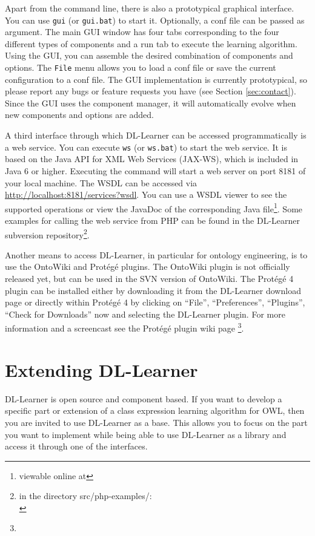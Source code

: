 \documentclass[a4paper,12pt]{scrartcl}
\begin{document}
Apart from the command line, there is also a prototypical graphical interface. You can use \verb|gui| (or \verb|gui.bat|) to start it. Optionally, a conf file can be passed as argument. The main GUI window has four tabs corresponding to the four different types of components and a run tab to execute the learning algorithm. Using the GUI, you can assemble the desired combination of components and options. The \verb|File| menu allows you to load a conf file or save the current configuration to a conf file. The GUI implementation is currently prototypical, so please report any bugs or feature requests you have (see Section \ref{sec:contact}). Since the GUI uses the component manager, it will automatically evolve when new components and options are added.

A third interface through which DL-Learner can be accessed programmatically is a web service. You can execute \verb|ws| (or \verb|ws.bat|) to start the web service. It is based on the Java API for XML Web Services (JAX-WS), which is included in Java 6 or higher. Executing the command will start a web server on port 8181 of your local machine. The WSDL can be accessed via \url{http://localhost:8181/services?wsdl}. You can use a WSDL viewer to see the supported operations or view the JavaDoc of the corresponding Java file\footnote{viewable online at \wsjavadoc}. Some examples for calling the web service from PHP can be found in the DL-Learner subversion repository\footnote{in the directory src/php-examples/:\\ \wsphpexamples}.

Another means to access DL-Learner, in particular for ontology engineering, is to use the OntoWiki and Protégé plugins. The OntoWiki plugin is not officially released yet, but can be used in the SVN version of OntoWiki. The Protégé 4 plugin can be installed either by downloading it from the DL-Learner download page or directly within Protégé 4 by clicking on ``File'', ``Preferences'', ``Plugins'', ``Check for Downloads'' now and selecting the DL-Learner plugin. For more information and a screencast see the Protégé plugin wiki page \footnote{\wikiprotplugin}.

\section{Extending DL-Learner}
\label{sec:developing}

DL-Learner is open source and component based. If you want to develop a specific part or extension of a class expression learning algorithm for OWL, then you are invited to use DL-Learner as a base. This allows you to focus on the part you want to implement while being able to use DL-Learner as a library and access it through one of the interfaces. 
\end{document}
